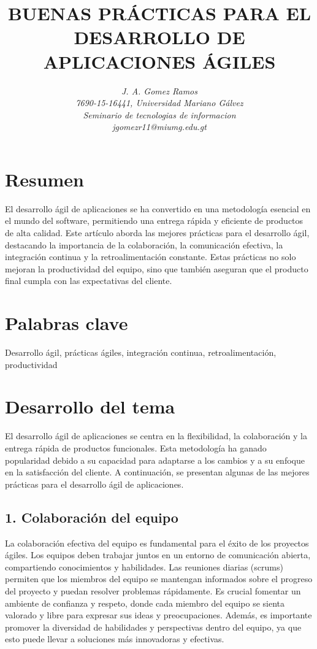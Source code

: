 \documentclass[12pt]{article}
\begin{document}
\title{\textbf{BUENAS PRÁCTICAS PARA EL DESARROLLO DE APLICACIONES ÁGILES}}
\author{\textit{J. A. Gomez Ramos}\\
\textit{7690-15-16441, Universidad Mariano Gálvez}\\
\textit{Seminario de tecnologias de informacion}\\
\textit{jgomezr11@miumg.edu.gt}}
\date{}
\maketitle

\section*{Resumen}
El desarrollo ágil de aplicaciones se ha convertido en una metodología esencial en el mundo del software, permitiendo una entrega rápida y eficiente de productos de alta calidad. Este artículo aborda las mejores prácticas para el desarrollo ágil, destacando la importancia de la colaboración, la comunicación efectiva, la integración continua y la retroalimentación constante. Estas prácticas no solo mejoran la productividad del equipo, sino que también aseguran que el producto final cumpla con las expectativas del cliente.

\section*{Palabras clave}
Desarrollo ágil, prácticas ágiles, integración continua, retroalimentación, productividad

\section*{Desarrollo del tema}

El desarrollo ágil de aplicaciones se centra en la flexibilidad, la colaboración y la entrega rápida de productos funcionales. Esta metodología ha ganado popularidad debido a su capacidad para adaptarse a los cambios y a su enfoque en la satisfacción del cliente. A continuación, se presentan algunas de las mejores prácticas para el desarrollo ágil de aplicaciones.

\subsection*{1. Colaboración del equipo}
La colaboración efectiva del equipo es fundamental para el éxito de los proyectos ágiles. Los equipos deben trabajar juntos en un entorno de comunicación abierta, compartiendo conocimientos y habilidades. Las reuniones diarias (scrums) permiten que los miembros del equipo se mantengan informados sobre el progreso del proyecto y puedan resolver problemas rápidamente. Es crucial fomentar un ambiente de confianza y respeto, donde cada miembro del equipo se sienta valorado y libre para expresar sus ideas y preocupaciones. Además, es importante promover la diversidad de habilidades y perspectivas dentro del equipo, ya que esto puede llevar a soluciones más innovadoras y efectivas.
\end{document}
